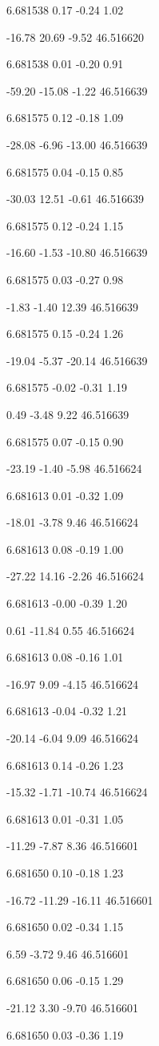 6.681538
0.17
-0.24
1.02

-16.78
20.69
-9.52
46.516620

6.681538
0.01
-0.20
0.91

-59.20
-15.08
-1.22
46.516639

6.681575
0.12
-0.18
1.09

-28.08
-6.96
-13.00
46.516639

6.681575
0.04
-0.15
0.85

-30.03
12.51
-0.61
46.516639

6.681575
0.12
-0.24
1.15

-16.60
-1.53
-10.80
46.516639

6.681575
0.03
-0.27
0.98

-1.83
-1.40
12.39
46.516639

6.681575
0.15
-0.24
1.26

-19.04
-5.37
-20.14
46.516639

6.681575
-0.02
-0.31
1.19

0.49
-3.48
9.22
46.516639

6.681575
0.07
-0.15
0.90

-23.19
-1.40
-5.98
46.516624

6.681613
0.01
-0.32
1.09

-18.01
-3.78
9.46
46.516624

6.681613
0.08
-0.19
1.00

-27.22
14.16
-2.26
46.516624

6.681613
-0.00
-0.39
1.20

0.61
-11.84
0.55
46.516624

6.681613
0.08
-0.16
1.01

-16.97
9.09
-4.15
46.516624

6.681613
-0.04
-0.32
1.21

-20.14
-6.04
9.09
46.516624

6.681613
0.14
-0.26
1.23

-15.32
-1.71
-10.74
46.516624

6.681613
0.01
-0.31
1.05

-11.29
-7.87
8.36
46.516601

6.681650
0.10
-0.18
1.23

-16.72
-11.29
-16.11
46.516601

6.681650
0.02
-0.34
1.15

6.59
-3.72
9.46
46.516601

6.681650
0.06
-0.15
1.29

-21.12
3.30
-9.70
46.516601

6.681650
0.03
-0.36
1.19

